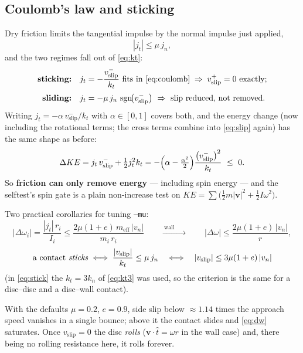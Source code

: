 \documentclass[a4paper,11pt]{article}
\newcommand{\vV}{\bm{v}}
\newcommand{\ttt}{\hat{t}}
\begin{document}
\subsection{Coulomb's law and sticking}
Dry friction limits the tangential impulse by the normal impulse just applied,
\begin{equation}
  |j_t|\le\mu\,j_n ,
  \label{eq:coulomb}
\end{equation}
and the two regimes fall out of \eqref{eq:kt}:
\begin{align}
  \text{\textbf{sticking:}}&\quad
    j_t=-\frac{v_{\text{slip}}^{-}}{k_t}\ \text{fits in \eqref{eq:coulomb}}
    \;\Rightarrow\; v_{\text{slip}}^{+}=0 \ \text{exactly};\\[2pt]
  \text{\textbf{sliding:}}&\quad
    j_t=-\mu\,j_n\,\operatorname{sgn}\!\bigl(v_{\text{slip}}^{-}\bigr)
    \ \Rightarrow\ \text{slip reduced, not removed.}
\end{align}
Writing $j_t=-\alpha\,v_{\text{slip}}^{-}/k_t$ with $\alpha\in[0,1]$ covers both,
and the energy change (now including the rotational terms; the cross terms
combine into \eqref{eq:slip} again) has the same shape as before:
\begin{equation}
  \Delta KE=j_t\,v_{\text{slip}}^{-}+\tfrac12 j_t^{2}k_t
          =-\Bigl(\alpha-\tfrac{\alpha^{2}}{2}\Bigr)
            \frac{\bigl(v_{\text{slip}}^{-}\bigr)^{2}}{k_t}\ \le\ 0 .
  \label{eq:friction-energy}
\end{equation}
So \textbf{friction can only remove energy} --- including spin energy --- and
the selftest's spin gate is a plain non-increase test on
$KE=\sum\bigl(\tfrac12 m|\vV|^2+\tfrac12 I\omega^2\bigr)$.

Two practical corollaries for tuning \texttt{--mu}:
\begin{equation}
  |\Delta\omega_i|=\frac{|j_t|\,r_i}{I_i}\le
  \frac{2\mu(1+e)\,m_{\text{eff}}\,|v_n|}{m_i\,r_i}
  \qquad\xrightarrow{\ \text{wall}\qquad}\qquad
  |\Delta\omega|\le\frac{2\mu(1+e)\,|v_n|}{r},
  \label{eq:dw}
\end{equation}
\begin{equation}
  \text{a contact \emph{sticks}}\iff
  \frac{|v_{\text{slip}}|}{k_t}\le\mu\,j_n
  \quad\Longleftrightarrow\quad
  |v_{\text{slip}}|\le 3\mu(1+e)\,|v_n|
  \label{eq:stick}
\end{equation}
(in \eqref{eq:stick} the $k_t=3k_n$ of \eqref{eq:kt3} was used, so the criterion
is the same for a disc--disc and a disc--wall contact).

With the defaults $\mu=0.2$, $e=0.9$, side slip below $\approx1.14$ times the
approach speed vanishes in a single bounce; above it the contact slides and
\eqref{eq:dw} saturates. Once $v_{\text{slip}}=0$ the disc \emph{rolls}
($\vV\cdot\ttt=\omega r$ in the wall case) and, there being no rolling
resistance here, it rolls forever.
\end{document}
